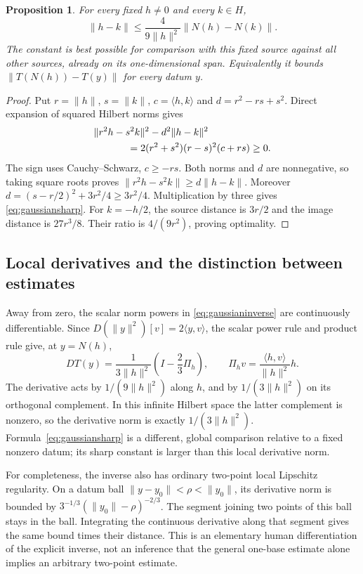 \documentclass[11pt]{article}
\newtheorem{proposition}[theorem]{Proposition}
\theoremstyle{remark}\newtheorem{remark}[theorem]{Remark}
\begin{document}
\begin{proposition}\label{prop:gaussiansharp}
For every fixed $h\ne0$ and every $k\in H$,
\begin{equation}\label{eq:gaussiansharp}
 \|h-k\|\leq\frac4{9\|h\|^2}\|N(h)-N(k)\|.
\end{equation}
The constant is best possible for comparison with this fixed source
against all other sources, already on its one-dimensional span.
Equivalently it bounds $\|T(N(h))-T(y)\|$ for every datum $y$.
\end{proposition}
\begin{proof}
Put $r=\|h\|$, $s=\|k\|$, $c=\langle h,k\rangle$ and
$d=r^2-rs+s^2$. Direct expansion of squared Hilbert norms gives
\begin{align*}
 &\|r^2h-s^2k\|^2-d^2\|h-k\|^2\\
 &\hspace{12mm}=2(r^2+s^2)(r-s)^2(c+rs)\geq0.
\end{align*}
The sign uses Cauchy--Schwarz, $c\geq-rs$. Both norms and $d$
are nonnegative, so taking square roots proves
$\|r^2h-s^2k\|\geq d\|h-k\|$.
Moreover $d=(s-r/2)^2+3r^2/4\geq3r^2/4$.
Multiplication by three gives \eqref{eq:gaussiansharp}.
For $k=-h/2$, the source distance is $3r/2$ and the image distance
is $27r^3/8$. Their ratio is $4/(9r^2)$, proving optimality.
\end{proof}

\subsection{Local derivatives and the distinction between estimates}
Away from zero, the scalar norm powers in \eqref{eq:gaussianinverse}
are continuously differentiable. Since
$D(\|y\|^2)[v]=2\langle y,v\rangle$, the scalar power rule and
product rule give, at $y=N(h)$,
\begin{equation}\label{eq:gaussianderivative}
 DT(y)=\frac1{3\|h\|^2}\left(I-\frac23\Pi_h\right),
 \qquad \Pi_hv=\frac{\langle h,v\rangle}{\|h\|^2}h.
\end{equation}
The derivative acts by $1/(9\|h\|^2)$ along $h$, and by
$1/(3\|h\|^2)$ on its orthogonal complement. In this infinite
Hilbert space the latter complement is nonzero, so the derivative
norm is exactly $1/(3\|h\|^2)$. Formula~\eqref{eq:gaussiansharp}
is a different, global comparison relative to a fixed nonzero datum;
its sharp constant is larger than this local derivative norm.

For completeness, the inverse also has ordinary two-point local
Lipschitz regularity. On a datum ball
$\|y-y_0\|<\rho<\|y_0\|$, its derivative norm is bounded by
$3^{-1/3}(\|y_0\|-\rho)^{-2/3}$. The segment joining two points
of this ball stays in the ball. Integrating the continuous derivative
along that segment gives the same bound times their distance.
This is an elementary human differentiation of the explicit inverse,
not an inference that the general one-base estimate alone implies
an arbitrary two-point estimate.
\end{document}
